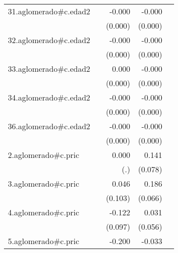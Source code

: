 {\begin{longtable}{l*{4}{D{.}{.}{-1}}}
\addlinespace
31.aglomerado#c.edad2&                     &      -0.000         &      -0.000\sym{***}&                     \\
            &                     &     (0.000)         &     (0.000)         &                     \\
\addlinespace
32.aglomerado#c.edad2&                     &      -0.000         &      -0.000         &                     \\
            &                     &     (0.000)         &     (0.000)         &                     \\
\addlinespace
33.aglomerado#c.edad2&                     &       0.000         &      -0.000         &                     \\
            &                     &     (0.000)         &     (0.000)         &                     \\
\addlinespace
34.aglomerado#c.edad2&                     &      -0.000         &      -0.000         &                     \\
            &                     &     (0.000)         &     (0.000)         &                     \\
\addlinespace
36.aglomerado#c.edad2&                     &      -0.000         &      -0.000\sym{**} &                     \\
            &                     &     (0.000)         &     (0.000)         &                     \\
\addlinespace
2.aglomerado#c.pric&                     &       0.000         &       0.141         &                     \\
            &                     &         (.)         &     (0.078)         &                     \\
\addlinespace
3.aglomerado#c.pric&                     &       0.046         &       0.186\sym{**} &                     \\
            &                     &     (0.103)         &     (0.066)         &                     \\
\addlinespace
4.aglomerado#c.pric&                     &      -0.122         &       0.031         &                     \\
            &                     &     (0.097)         &     (0.056)         &                     \\
\addlinespace
5.aglomerado#c.pric&                     &      -0.200         &      -0.033         &                     \\

\end{longtable}}
